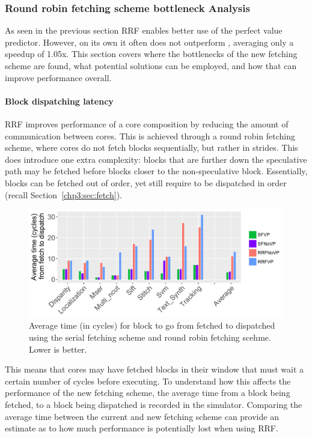 \subsubsection{Round robin fetching scheme bottleneck Analysis}

As seen in the previous section RRF enables better use of the perfect value predictor. 
However, on its own it often does not outperform \novp{}, averaging only a speedup of 1.05x.
This section covers where the bottlenecks of the new fetching scheme are found, what potential solutions can be employed, and how that can improve performance overall.

\paragraph*{Block dispatching latency}

RRF improves performance of a core composition by reducing the amount of communication between cores.
This is achieved through a round robin fetching scheme, where cores do not fetch blocks sequentially, but rather in strides.
This does introduce one extra complexity: blocks that are further down the speculative path may be fetched before blocks closer to the non-speculative block.
Essentially, blocks can be fetched out of order, yet still require to be dispatched in order (recall Section~\ref{chp3:sec:fetch}).

\begin{figure}[t]
    \centering
    \includegraphics[width=1\textwidth]{chapter3/graphics/avTimeToFetch3.pdf}
    \caption{Average time (in cycles) for block to go from fetched to dispatched using the serial fetching scheme and round robin fetching scehme. Lower is better.}
    \label{fig:av_time}
	\vspace{1em}
\end{figure}

This means that cores may have fetched blocks in their window that must wait a certain number of cycles before executing.
To understand how this affects the performance of the new fetching scheme, the average time from a block being fetched, to a block being dispatched is recorded in the simulator.
Comparing the average time between the current and new fetching scheme can provide an estimate as to how much performance is potentially lost when using RRF.

